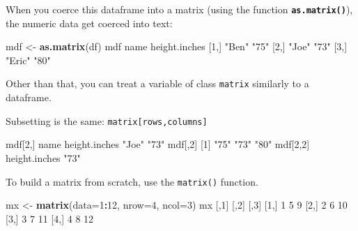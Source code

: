 \documentclass[
]{book}
\newenvironment{Shaded}{\begin{snugshade}}{\end{snugshade}}
\newcommand{\DataTypeTok}[1]{\textcolor[rgb]{0.13,0.29,0.53}{#1}}
\newcommand{\DecValTok}[1]{\textcolor[rgb]{0.00,0.00,0.81}{#1}}
\newcommand{\KeywordTok}[1]{\textcolor[rgb]{0.13,0.29,0.53}{\textbf{#1}}}
\newcommand{\NormalTok}[1]{#1}
\newcommand{\OperatorTok}[1]{\textcolor[rgb]{0.81,0.36,0.00}{\textbf{#1}}}
\newcommand{\StringTok}[1]{\textcolor[rgb]{0.31,0.60,0.02}{#1}}
\begin{document}
When you coerce this dataframe into a matrix (using the function \textbf{\texttt{as.matrix()}}), the numeric data get coerced into text:

\begin{Shaded}
\begin{Highlighting}[]
\NormalTok{mdf <-}\StringTok{ }\KeywordTok{as.matrix}\NormalTok{(df)}
\NormalTok{mdf}
\NormalTok{     name   height.inches}
\NormalTok{[}\DecValTok{1}\NormalTok{,] }\StringTok{"Ben"}  \StringTok{"75"}         
\NormalTok{[}\DecValTok{2}\NormalTok{,] }\StringTok{"Joe"}  \StringTok{"73"}         
\NormalTok{[}\DecValTok{3}\NormalTok{,] }\StringTok{"Eric"} \StringTok{"80"}         
\end{Highlighting}
\end{Shaded}

Other than that, you can treat a variable of class \texttt{matrix} similarly to a dataframe.

Subsetting is the same: \texttt{matrix{[}rows,columns{]}}

\begin{Shaded}
\begin{Highlighting}[]
\NormalTok{mdf[}\DecValTok{2}\NormalTok{,]}
\NormalTok{         name height.inches }
        \StringTok{"Joe"}          \StringTok{"73"} 
\NormalTok{mdf[,}\DecValTok{2}\NormalTok{]}
\NormalTok{[}\DecValTok{1}\NormalTok{] }\StringTok{"75"} \StringTok{"73"} \StringTok{"80"}
\NormalTok{mdf[}\DecValTok{2}\NormalTok{,}\DecValTok{2}\NormalTok{]}
\NormalTok{height.inches }
         \StringTok{"73"} 
\end{Highlighting}
\end{Shaded}

To build a matrix from scratch, use the \texttt{matrix()} function.

\begin{Shaded}
\begin{Highlighting}[]
\NormalTok{mx <-}\StringTok{ }\KeywordTok{matrix}\NormalTok{(}\DataTypeTok{data=}\DecValTok{1}\OperatorTok{:}\DecValTok{12}\NormalTok{, }
             \DataTypeTok{nrow=}\DecValTok{4}\NormalTok{,}
             \DataTypeTok{ncol=}\DecValTok{3}\NormalTok{)}
\NormalTok{mx}
\NormalTok{     [,}\DecValTok{1}\NormalTok{] [,}\DecValTok{2}\NormalTok{] [,}\DecValTok{3}\NormalTok{]}
\NormalTok{[}\DecValTok{1}\NormalTok{,]    }\DecValTok{1}    \DecValTok{5}    \DecValTok{9}
\NormalTok{[}\DecValTok{2}\NormalTok{,]    }\DecValTok{2}    \DecValTok{6}   \DecValTok{10}
\NormalTok{[}\DecValTok{3}\NormalTok{,]    }\DecValTok{3}    \DecValTok{7}   \DecValTok{11}
\NormalTok{[}\DecValTok{4}\NormalTok{,]    }\DecValTok{4}    \DecValTok{8}   \DecValTok{12}
\end{Highlighting}
\end{Shaded}
\end{document}
